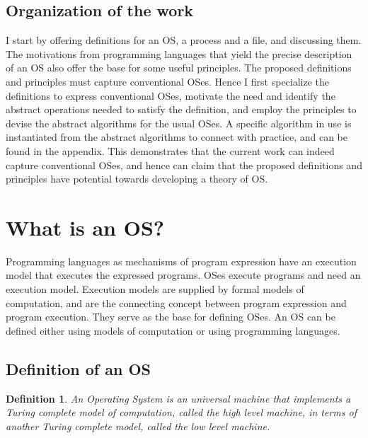 \documentclass[draft]{article}
\newcounter{thedefn}
\newtheorem{mydefinition}[thedefn]{Definition}
\begin{document}
\subsection{Organization of the work}
\label{sec:organisation}

I start by  offering definitions for an OS, a process  and a file, and
discussing  them.   The motivations  from  programming languages  that
yield the  precise description of an  OS also offer the  base for some
useful  principles.   The  proposed  definitions and  principles  must
capture conventional  OSes.  Hence I first  specialize the definitions
to  express conventional  OSes,  motivate the  need  and identify  the
abstract operations  needed to satisfy the definition,  and employ the
principles to  devise the abstract  algorithms for the usual  OSes.  A
specific algorithm in use is instantiated from the abstract algorithms
to  connect with practice,  and can  be found  in the  appendix.  This
demonstrates  that the  current work  can indeed  capture conventional
OSes, and hence can claim that the proposed definitions and principles
have  potential towards  developing a  theory of  OS.


\section{What is an OS?}
\label{sec:what:is:an:os}

Programming  languages as  mechanisms  of program  expression have  an
execution model  that executes  the expressed programs.   OSes execute
programs and  need an execution model.  Execution  models are supplied
by  formal  models of  computation,  and  are  the connecting  concept
between program  expression and program execution.  They  serve as the
base for defining  OSes.  An OS can be defined  either using models of
computation or using programming languages.

\subsection{Definition of an OS}
\label{sec:os:defn}
\label{sec:defns}

\begin{mydefinition}
  \label{basic:os:def:1}
  An \emph{Operating System} is an universal machine that implements a
  Turing complete model of computation, called the high level machine,
  in  terms of  another Turing  complete model,  called the  low level
  machine.
\end{mydefinition}
\end{document}
